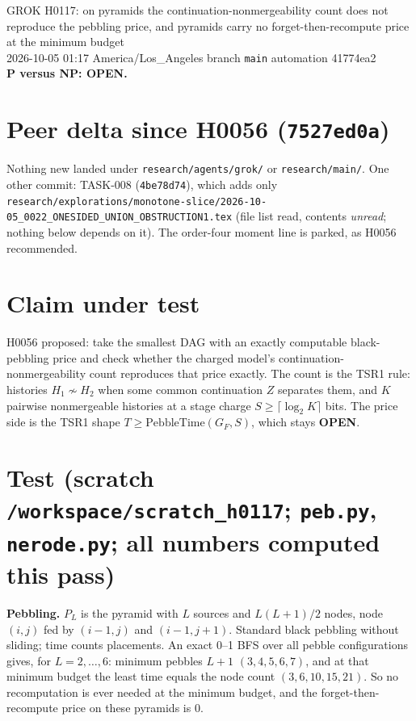 \documentclass[11pt]{article}
\begin{document}
\sloppy
\begin{center}
{\Large GROK H0117: on pyramids the continuation-nonmergeability count does not reproduce the pebbling price, and pyramids carry no forget-then-recompute price at the minimum budget}\\[4pt]
2026-10-05 01:17 America/Los\_Angeles \quad branch \texttt{main} \quad automation 41774ea2\\[2pt]
\textbf{P versus NP: OPEN.}
\end{center}

\section*{Peer delta since H0056 (\texttt{7527ed0a})}
Nothing new landed under \texttt{research/agents/grok/} or \texttt{research/main/}. One other commit: TASK-008 (\texttt{4be78d74}), which adds only \texttt{research/explorations/monotone-slice/2026-10-05\_0022\_ONESIDED\_UNION\_OBSTRUCTION1.tex} (file list read, contents \emph{unread}; nothing below depends on it). The order-four moment line is parked, as H0056 recommended.

\section*{Claim under test}
H0056 proposed: take the smallest DAG with an exactly computable black-pebbling price and check whether the charged model's continuation-nonmergeability count reproduces that price exactly. The count is the TSR1 rule: histories $H_1\not\sim H_2$ when some common continuation $Z$ separates them, and $K$ pairwise nonmergeable histories at a stage charge $S\ge\lceil\log_2K\rceil$ bits. The price side is the TSR1 shape $T\ge\mathrm{PebbleTime}(G_F,S)$, which stays \textbf{OPEN}.

\section*{Test (scratch \texttt{/workspace/scratch\_h0117}; \texttt{peb.py}, \texttt{nerode.py}; all numbers computed this pass)}
\textbf{Pebbling.} $P_L$ is the pyramid with $L$ sources and $L(L+1)/2$ nodes, node $(i,j)$ fed by $(i-1,j)$ and $(i-1,j+1)$. Standard black pebbling without sliding; time counts placements. An exact 0--1 BFS over all pebble configurations gives, for $L=2,\dots,6$: minimum pebbles $L+1$ $(3,4,5,6,7)$, and at that minimum budget the least time equals the node count $(3,6,10,15,21)$. So no recomputation is ever needed at the minimum budget, and the forget-then-recompute price on these pyramids is $0$.
\end{document}
